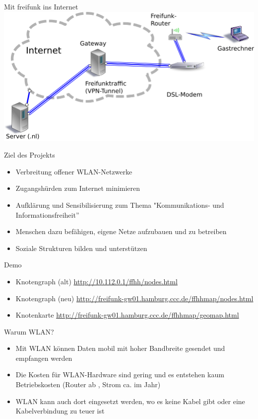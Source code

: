 \documentclass[c]{beamer}
\begin{document}
\begin{frame}{Mit freifunk ins Internet}
	\includegraphics[width=\textwidth]{Bilder/Freifunk_Knotenanbindung}
\end{frame}


\begin{frame}{Ziel des Projekts}
	\begin{itemize}
		\item Verbreitung offener WLAN-Netzwerke
		\item Zugangshürden zum Internet minimieren
		\item Aufklärung und Sensibilisierung zum Thema "Kommunikations- und Informationsfreiheit''
		\item Menschen dazu befähigen, eigene Netze aufzubauen und zu betreiben
		\item Soziale Strukturen bilden und unterstützen
	\end{itemize}
\end{frame}


\begin{frame}{Demo}
	\begin{itemize}
		\item Knotengraph (alt) \href{http://10.112.0.1/ffhh/nodes.html}{http://10.112.0.1/ffhh/nodes.html}
		\item Knotengraph (neu)  \href{http://freifunk-gw01.hamburg.ccc.de/ffhhmap/nodes.html}{http://freifunk-gw01.hamburg.ccc.de/ffhhmap/nodes.html}
		\item Knotenkarte \href{http://freifunk-gw01.hamburg.ccc.de/ffhhmap/geomap.html}{http://freifunk-gw01.hamburg.ccc.de/ffhhmap/geomap.html}
	\end{itemize}
\end{frame}



\begin{frame}{Warum WLAN?}
	\begin{itemize}
		\item Mit WLAN können Daten mobil mit hoher Bandbreite gesendet und empfangen werden
		\item Die Kosten für WLAN-Hardware sind gering und es entstehen kaum Betriebskosten (Router ab , Strom ca.  im Jahr)
		\item WLAN kann auch dort eingesetzt werden, wo es keine Kabel gibt oder eine Kabelverbindung zu teuer ist
	\end{itemize}
\end{frame}
\end{document}
